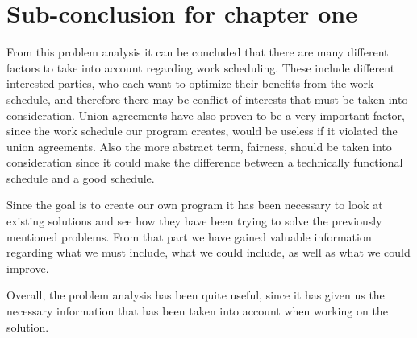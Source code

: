 \section{Sub-conclusion for chapter one}
From this problem analysis it can be concluded that there are many different factors to take into account regarding work scheduling. These include different interested parties, who each want to optimize their benefits from the work schedule, and therefore there may be conflict of interests that must be taken into consideration. Union agreements have also proven to be a very important factor, since the work schedule our program creates, would be useless if it violated the union agreements. Also the more abstract term, fairness, should be taken into consideration since it could make the difference between a technically functional schedule and a good schedule.

Since the goal is to create our own program it has been necessary to look at existing solutions and see how they have been trying to solve the previously mentioned problems. From that part we have gained valuable information regarding what we must include, what we could include, as well as what we could improve.

Overall, the problem analysis has been quite useful, since it has given us the necessary information that has been taken into account when working on the solution.